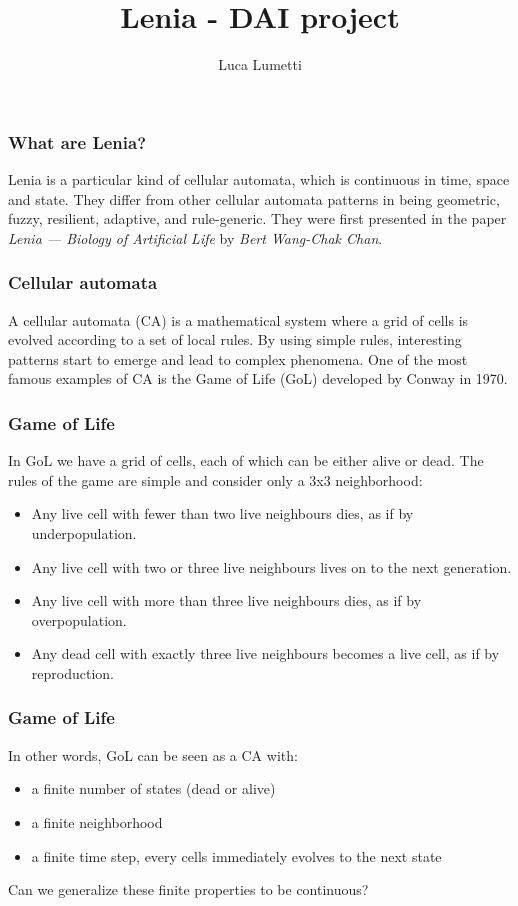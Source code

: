\documentclass{beamer}
\title{Lenia - DAI project}
\author[Luca Lumetti]{Luca Lumetti}
\begin{document}
\frame{\titlepage}

\begin{frame}
\frametitle{What are Lenia?}
  Lenia is a particular kind of cellular automata, which is continuous in time,
  space and state. They differ from other cellular automata patterns in being
  geometric, fuzzy, resilient, adaptive, and rule-generic. They were
  first presented in the paper \emph{Lenia — Biology of Artificial Life} by
  \emph{Bert Wang-Chak Chan}.
\end{frame}

\begin{frame}
  \frametitle{Cellular automata}
  A cellular automata (CA) is a mathematical system where a grid of cells is
  evolved according to a set of local rules. By using simple rules, interesting
  patterns start to emerge and lead to complex phenomena. One of the most famous
  examples of CA is the Game of Life (GoL) developed by Conway in 1970.
\end{frame}

\begin{frame}
  \frametitle{Game of Life}
  In GoL we have a grid of cells, each of which can be either alive or dead. The
  rules of the game are simple and consider only a 3x3 neighborhood:
  \begin{itemize}
    \item Any live cell with fewer than two live neighbours dies, as if by
          underpopulation.
    \item Any live cell with two or three live neighbours lives on to the next
          generation.
    \item Any live cell with more than three live neighbours dies, as if by
          overpopulation.
    \item Any dead cell with exactly three live neighbours becomes a live cell,
          as if by reproduction.
  \end{itemize}
\end{frame}

\begin{frame}
  \frametitle{Game of Life}
  In other words, GoL can be seen as a CA with:
  \begin{itemize}
    \item a finite number of states (dead or alive)
    \item a finite neighborhood
    \item a finite time step, every cells immediately evolves to the next state
  \end{itemize}
  Can we generalize these finite properties to be continuous?
\end{frame}
\end{document}
